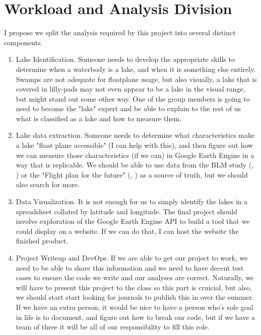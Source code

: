 \documentclass[
    ngerman,american
    ]{scrartcl}
\renewcommand{\cite}[1]{ (\citeauthor{#1}, \citeyear{#1})}
\begin{document}
                
                

        \section{Workload and Analysis Division}


            I propose we split the analysis required by this project into several distinct components.

            \begin{enumerate}
                \item Lake Identification.  Someone needs to develop the appropriate skills to determine when a waterbody is a lake, and when it is something else entirely.  Swamps are not adequate for floatplane usage, but also visually, a lake that is covered in lilly-pads may not even appear to be a lake in the visual range, but might stand out some other way.  One of the group members is going to need to become the "lake" expert and be able to explain to the rest of us what is classified as a lake and how to measure them.

                \item Lake data extraction.  Someone needs to determine what characteristics make a lake "float plane accessible" (I can help with this), and then figure out how we can measure those characteristics (if we can) in Google Earth Engine in a way that is replicable.  We should be able to use data from the BLM study \cite{trammel2016} or the "Flight plan for the future" \cite{schwoerer2022flight} as a source of truth, but we should also search for more.

                \item Data Visualization.  It is not enough for us to simply identify the lakes in a spreadsheet collated by latitude and longitude.  The final project should involve exploration of the Google Earth Engine API to build a tool that we could display on a website.  If we can do that, I can host the website the finished product.

                \item Project Writeup and DevOps.  If we are able to get our project to work, we need to be able to share this information and we need to have decent test cases to ensure the code we write and our analyses are correct.  Naturally, we will have to present this project to the class so this part is cruicial, but also, we should start start looking for journals to publish this in over the summer.  If we have an extra person, it would be nice to have a person who's sole goal in life is to document, and figure out how to break our code, but if we have a team of three it will be all of our responsibility to fill this role.
            \end{enumerate}
                
\end{document}

